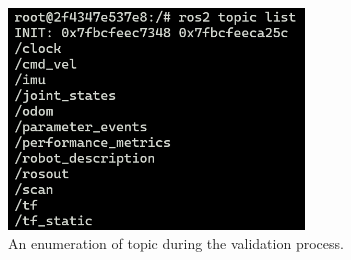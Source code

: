 \begin{figure}[ht!]
    \centering
    \includegraphics[width=0.7\textwidth]{./figures/data/ROS2_listado_topicos.png}
    \caption{An enumeration of topic during the validation process.}
    \label{fig:ROS2_listado_topicos}
\end{figure}